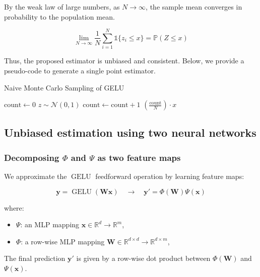 \documentclass{article}
\begin{document}
By the weak law of large numbers, as $N \to \infty$, the sample mean converges in probability to the population mean.

$$
\lim_{N \to \infty} \frac{1}{N} \sum_{i=1}^{N} \mathds{1}\{z_i \leq x\} = \mathbb{P}(Z \leq x)
$$

Thus, the proposed estimator is unbiased and consistent. Below, we provide a pseudo-code to generate a single point estimator.

\begin{algorithm}
\caption{Naive Monte Carlo Sampling of GELU}
\begin{algorithmic}[1]
\State $\text{count} \gets 0$
        \State $z \sim \mathcal{N}(0, 1)$  
            \State $\text{count} \gets \text{count} + 1$  
        \EndIf
    \EndFor
    \State \Return $\left(\frac{\text{count}}{N}\right) \cdot x$ 
\EndFunction
\end{algorithmic}
\end{algorithm}

\subsection{Unbiased estimation using two neural networks}

\subsubsection{Decomposing $\Phi$ and $\Psi$ as two feature maps}

We approximate the $\operatorname{GELU}$ feedforward operation by learning feature maps:

\[
\mathbf{y} = \operatorname{GELU}(\mathbf{W} \mathbf{x}) \quad \longrightarrow \quad \mathbf{y}' = \Phi(\mathbf{W}) \Psi(\mathbf{x})
\]

where:
\begin{itemize}
  \item $\Psi$: an MLP mapping $\mathbf{x} \in \mathbb{R}^d \to \mathbb{R}^m$,
  \item $\Phi$: a row-wise MLP mapping $\mathbf{W} \in \mathbb{R}^{d \times d} \to \mathbb{R}^{d \times m}$,
\end{itemize}
The final prediction $\mathbf{y}'$ is given by a row-wise dot product between $\Phi(\mathbf{W})$ and $\Psi(\mathbf{x})$.
\end{document}
